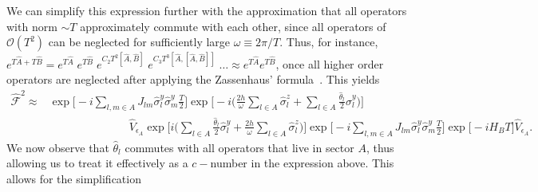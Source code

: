 \documentclass[%
reprint,
superscriptaddress,
amsmath,amssymb,showkeys,
aps,
prb,
]{revtex4-2}
\begin{document}
	We can simplify this expression further with the approximation that all operators with norm $\sim T$ approximately commute with each other, since all operators of $\mathcal{O}(T^2)$ can be neglected for sufficiently large $\omega\equiv 2\pi/T$. Thus, for instance, $e^{T\hat{A} + T\hat{B}}= e^{T\hat{A}}\; e^{T\hat{B}}\;e^{C_2 T^2\left[\hat{A}, \hat{B}\right]}\;e^{C_3 T^3\left[\hat{A},\left[\hat{A}, \hat{B}\right]\right]}\;\dots \approx e^{T\hat{A}} e^{T\hat{B}}$, once all higher order operators are neglected after applying the Zassenhaus' formula~\cite{Magnus1954}. This yields
		\begin{align}	
	\hat{\mathcal{F}}^2 	\approx& \exp\Bigg[-i \sum_{l,m\in A}J_{lm} \hat{\sigma}^y_l\hat{\sigma}^y_m\frac{T}{2}\Bigg] \exp\Bigg[-i\Big(\frac{2h}{\omega } \sum_{l\in A}^{}\hat{\sigma}^z_l + \sum_{l \in A}\frac{\hat{\theta}_{l}}{2}\hat{\sigma}^y_l\Big)\Bigg]\nonumber\\ 
		&\hspace{3cm} \hat{V}_{\epsilon_A} \exp\Bigg[i \Big(\sum_{l \in A}\frac{\hat{\theta}_{l}}{2}\hat{\sigma}^y_l + \frac{2h}{\omega} \sum_{l\in A}^{}\hat{\sigma}^z_l\Big)\Bigg] \exp\Bigg[-i\sum_{l,m\in A}J_{lm} \hat{\sigma}^y_l\hat{\sigma}^y_m\frac{T}{2}\Bigg] \exp\big[-i H_B T\big]\hat{V}_{\epsilon_A}.\nonumber
	\end{align}
	We now observe that $\hat{\theta}_l$ commutes with all operators that live in sector $A$, thus allowing us to treat it effectively as a $c-$number in the expression above. This allows for the simplification
\end{document}

